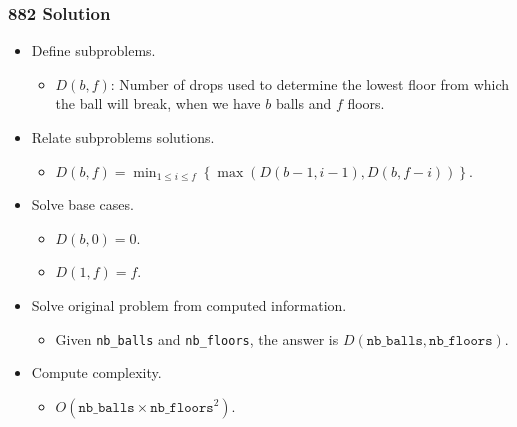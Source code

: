\documentclass{beamer}
\newcommand{\uvalink}[2]{UVa Online Judge (http://uva.onlinejudge.org)
  problem number \href{#2}{\textcolor{blue}{#1}.}}
\newcounter{exo}
\newcommand{\exo}{
  \addtocounter{exo}{1}
  Exercice \arabic{exo}
}
\begin{document}
\fi


\ifanswers

\begin{frame}%
\frametitle{882 Solution}

\scriptsize
\begin{itemize}

\item Define subproblems.
\begin{itemize}
\scriptsize
\item $D(b, f)$: Number of drops used to determine the lowest floor from which the ball will break, when
we have $b$ balls and $f$ floors.
\end{itemize}

\vspace{0.1cm}

\item<2-> Relate subproblems solutions.
\begin{itemize}
\scriptsize
\item<2-> $D(b, f) = \min_{1 \le i \le f}\left\{ \max(D(b - 1, i - 1), D(b, f - i)) \right\}$.
\end{itemize}

\vspace{0.1cm}

\item<3-> Solve base cases.
\begin{itemize}
\scriptsize
\item<3-> $D(b, 0) = 0$.
\item<3-> $D(1, f) = f$.
\end{itemize}

\vspace{0.1cm}

\item<4-> Solve original problem from computed information.
\begin{itemize}
\scriptsize
\item<4-> Given \texttt{nb\_balls} and \texttt{nb\_floors}, the answer is $D(\texttt{nb\_balls}, \texttt{nb\_floors})$.
\end{itemize}

\vspace{0.1cm}

\item<5-> Compute complexity.
\begin{itemize}
\scriptsize
\item<5-> $O(\texttt{nb\_balls} \times \texttt{nb\_floors}^2)$.
\end{itemize}

\end{itemize}

\end{frame}
\end{document}
